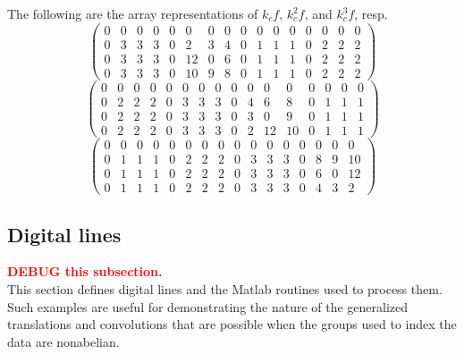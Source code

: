 The following are the array representations of $k_c f, \, k_c^2 f$, and $k_c^3 f$, resp. 
{\footnotesize
\begin{equation*}
\left(
\begin{array}{cccc|cccc|cccc|cccc}
0 & 0 & 0 & 0 & 0 & 0  & 0 & 0 & 0 & 0 & 0 & 0 & 0 & 0 & 0 & 0 \\ 
0 & 3 & 3 & 3 & 0 & 2  & 3 & 4 & 0 & 1 & 1 & 1 & 0 & 2 & 2 & 2 \\ 
0 & 3 & 3 & 3 & 0 & 12 & 0 & 6 & 0 & 1 & 1 & 1 & 0 & 2 & 2 & 2 \\ 
0 & 3 & 3 & 3 & 0 & 10 & 9 & 8 & 0 & 1 & 1 & 1 & 0 & 2 & 2 & 2 
\end{array}\right)
\end{equation*}
\begin{equation*}
\left(
\begin{array}{cccc|cccc|cccc|cccc}
0 & 0 & 0 & 0 & 0 & 0 & 0 & 0 & 0 & 0 & 0  & 0  & 0 & 0 & 0 & 0 \\ 
0 & 2 & 2 & 2 & 0 & 3 & 3 & 3 & 0 & 4 & 6  & 8  & 0 & 1 & 1 & 1 \\ 
0 & 2 & 2 & 2 & 0 & 3 & 3 & 3 & 0 & 3 & 0  & 9  & 0 & 1 & 1 & 1 \\ 
0 & 2 & 2 & 2 & 0 & 3 & 3 & 3 & 0 & 2 & 12 & 10 & 0 & 1 & 1 & 1 
\end{array}\right)
\end{equation*}
\begin{equation*}
\left(
\begin{array}{cccc|cccc|cccc|cccc}
0 & 0 & 0 & 0 & 0 & 0 & 0 & 0 & 0 & 0 & 0 & 0 & 0 & 0 & 0 & 0 \\ 
0 & 1 & 1 & 1 & 0 & 2 & 2 & 2 & 0 & 3 & 3 & 3 & 0 & 8 & 9 & 10 \\ 
0 & 1 & 1 & 1 & 0 & 2 & 2 & 2 & 0 & 3 & 3 & 3 & 0 & 6 & 0 & 12 \\ 
0 & 1 & 1 & 1 & 0 & 2 & 2 & 2 & 0 & 3 & 3 & 3 & 0 & 4 & 3 & 2 
\end{array}\right)
\end{equation*}
}

\subsection{Digital lines}
\textcolor{red}{\bf DEBUG this subsection.}\\
This section defines digital lines and the Matlab
routines used to process them. Such examples are useful
for demonstrating the nature of the generalized
translations and convolutions that are possible when 
the groups used to index the data are nonabelian.

